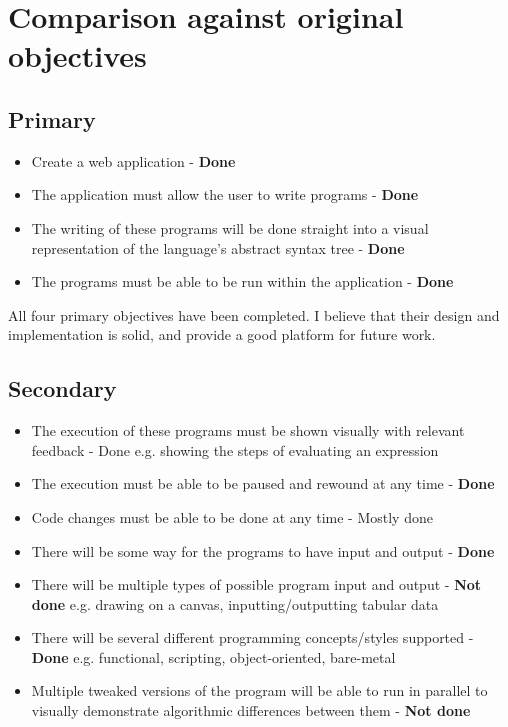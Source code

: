 \section{Comparison against original objectives}

\subsection{Primary}

\begin{itemize}
\item Create a web application - \textbf{Done}
\item The application must allow the user to write programs - \textbf{Done}
\item The writing of these programs will be done straight into a visual representation of the language's abstract syntax tree - \textbf{Done}
\item The programs must be able to be run within the application - \textbf{Done}
\end{itemize}

All four primary objectives have been completed. I believe that their design and implementation is solid, and provide a good platform for future work.

\subsection{Secondary}

\begin{itemize}
\item The execution of these programs must be shown visually with relevant feedback - Done
\subitem e.g. showing the steps of evaluating an expression
\item The execution must be able to be paused and rewound at any time - \textbf{Done}
\item Code changes must be able to be done at any time - Mostly done
\item There will be some way for the programs to have input and output - \textbf{Done}
\item There will be multiple types of possible program input and output - \textbf{Not done}
\subitem e.g. drawing on a canvas, inputting/outputting tabular data
\item There will be several different programming concepts/styles supported - \textbf{Done}
\subitem e.g. functional, scripting, object-oriented, bare-metal
\item Multiple tweaked versions of the program will be able to run in parallel to visually demonstrate algorithmic differences between them - \textbf{Not done}
\end{itemize}

